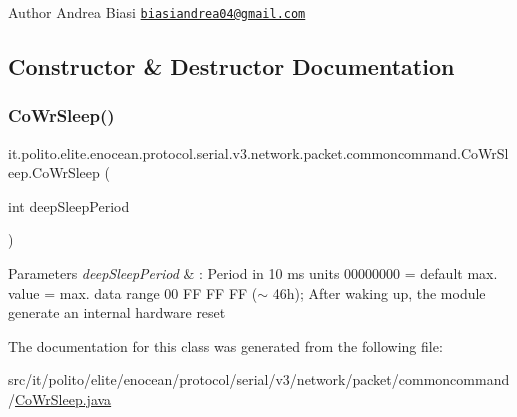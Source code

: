 \begin{DoxyAuthor}{Author}
Andrea Biasi \href{mailto:biasiandrea04@gmail.com}{\tt biasiandrea04@gmail.\+com} 
\end{DoxyAuthor}


\subsection{Constructor \& Destructor Documentation}
\hypertarget{classit_1_1polito_1_1elite_1_1enocean_1_1protocol_1_1serial_1_1v3_1_1network_1_1packet_1_1commoncommand_1_1_co_wr_sleep_ac86ab6c5db13d1d957ac557cf87dfc5f}{}\label{classit_1_1polito_1_1elite_1_1enocean_1_1protocol_1_1serial_1_1v3_1_1network_1_1packet_1_1commoncommand_1_1_co_wr_sleep_ac86ab6c5db13d1d957ac557cf87dfc5f} 
\subsubsection{\texorpdfstring{Co\+Wr\+Sleep()}{CoWrSleep()}}
{\footnotesize\ttfamily it.\+polito.\+elite.\+enocean.\+protocol.\+serial.\+v3.\+network.\+packet.\+commoncommand.\+Co\+Wr\+Sleep.\+Co\+Wr\+Sleep (\begin{DoxyParamCaption}\item[{int}]{deep\+Sleep\+Period }\end{DoxyParamCaption})}


\begin{DoxyParams}{Parameters}
{\em deep\+Sleep\+Period} & \+: Period in 10 ms units 00000000 = default max. value = max. data range 00 FF FF FF ($\sim$ 46h); After waking up, the module generate an internal hardware reset \\
\hline
\end{DoxyParams}


The documentation for this class was generated from the following file\+:\begin{DoxyCompactItemize}
\item 
src/it/polito/elite/enocean/protocol/serial/v3/network/packet/commoncommand/\hyperlink{_co_wr_sleep_8java}{Co\+Wr\+Sleep.\+java}\end{DoxyCompactItemize}
